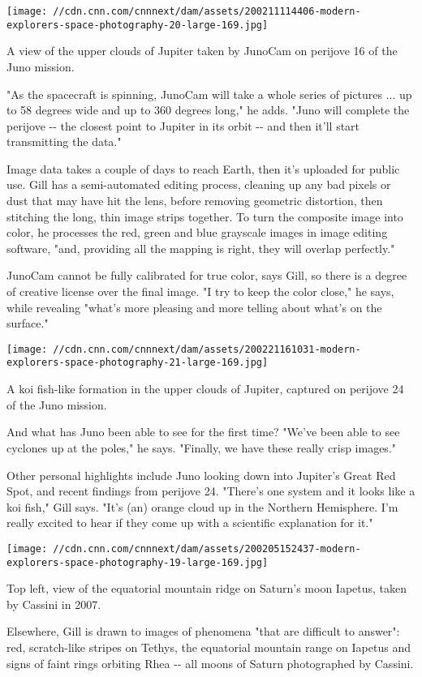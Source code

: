 \texttt{[image: //cdn.cnn.com/cnnnext/dam/assets/200211114406-modern-explorers-space-photography-20-large-169.jpg]}

A view of the upper clouds of Jupiter taken by JunoCam on perijove 16 of
the Juno mission.

"As the spacecraft is spinning, JunoCam will take a whole series of
pictures ... up to 58 degrees wide and up to 360 degrees long," he adds.
"Juno will complete the perijove -\/- the closest point to Jupiter in
its orbit -\/- and then it'll start transmitting the data."

Image data takes a couple of days to reach Earth, then it's uploaded for
public use. Gill has a semi-automated editing process, cleaning up any
bad pixels or dust that may have hit the lens, before removing geometric
distortion, then stitching the long, thin image strips together. To turn
the composite image into color, he processes the red, green and blue
grayscale images in image editing software, "and, providing all the
mapping is right, they will overlap perfectly."

JunoCam cannot be fully calibrated for true color, says Gill, so there
is a degree of creative license over the final image. "I try to keep the
color close," he says, while revealing "what's more pleasing and more
telling about what's on the surface."

\texttt{[image: //cdn.cnn.com/cnnnext/dam/assets/200221161031-modern-explorers-space-photography-21-large-169.jpg]}

A koi fish-like formation in the upper clouds of Jupiter, captured on
perijove 24 of the Juno mission.

And what has Juno been able to see for the first time? "We've been able
to see cyclones up at the poles," he says. "Finally, we have these
really crisp images."

Other personal highlights include Juno looking down into Jupiter's Great
Red Spot, and recent findings from perijove 24. "There's one system and
it looks like a koi fish," Gill says. "It's (an) orange cloud up in the
Northern Hemisphere. I'm really excited to hear if they come up with a
scientific explanation for it."

\texttt{[image: //cdn.cnn.com/cnnnext/dam/assets/200205152437-modern-explorers-space-photography-19-large-169.jpg]}

Top left, view of the equatorial mountain ridge on Saturn's moon
Iapetus, taken by Cassini in 2007.

Elsewhere, Gill is drawn to images of phenomena "that are difficult to
answer": red, scratch-like stripes on Tethys, the equatorial mountain
range on Iapetus and signs of faint rings orbiting Rhea -\/- all moons
of Saturn photographed by Cassini.


